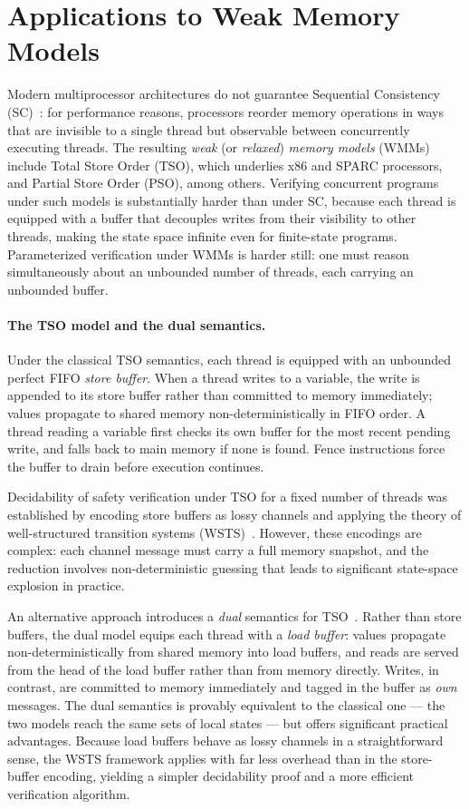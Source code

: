 \section{Applications to Weak Memory Models}

Modern multiprocessor architectures do not guarantee Sequential Consistency
(SC)~\cite{Lam79}: for performance reasons, processors reorder memory
operations in ways that are invisible to a single thread but observable between
concurrently executing threads. The resulting \emph{weak} (or \emph{relaxed})
\emph{memory models} (WMMs) include Total Store Order (TSO), which underlies
x86 and SPARC processors, and Partial Store Order (PSO), among others.
Verifying concurrent programs under such models is substantially harder than
under SC, because each thread is equipped with a buffer that decouples writes
from their visibility to other threads, making the state space infinite even
for finite-state programs. Parameterized verification under WMMs is harder
still: one must reason simultaneously about an unbounded number of threads,
each carrying an unbounded buffer.

\paragraph{The TSO model and the dual semantics.}
Under the classical TSO semantics, each thread is equipped with an unbounded
perfect FIFO \emph{store buffer}. When a thread writes to a variable, the
write is appended to its store buffer rather than committed to memory
immediately; values propagate to shared memory non-deterministically in FIFO
order. A thread reading a variable first checks its own buffer for the most
recent pending write, and falls back to main memory if none is found. Fence
instructions force the buffer to drain before execution continues.

Decidability of safety verification under TSO for a fixed number of threads
was established by encoding store buffers as lossy channels and applying the
theory of well-structured transition systems (WSTS)~\cite{ABBM10}. However,
these encodings are complex: each channel message must carry a full memory
snapshot, and the reduction involves non-deterministic guessing that leads to
significant state-space explosion in practice.

An alternative approach introduces a \emph{dual} semantics for
TSO~\cite{AABN16,AABN_journal}. Rather than store buffers, the dual model
equips each thread with a \emph{load buffer}: values propagate
non-deterministically from shared memory into load buffers, and reads are
served from the head of the load buffer rather than from memory directly.
Writes, in contrast, are committed to memory immediately and tagged in the
buffer as \emph{own} messages. The dual semantics is provably equivalent to
the classical one --- the two models reach the same sets of local states ---
but offers significant practical advantages. Because load buffers behave as
lossy channels in a straightforward sense, the WSTS framework applies with
far less overhead than in the store-buffer encoding, yielding a simpler
decidability proof and a more efficient verification algorithm.


